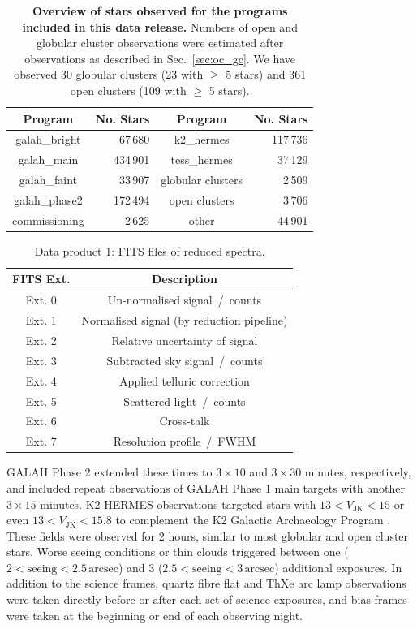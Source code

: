 \documentclass[
  journal=pasa,
  manuscript=research-paper, %
  year=2024,
  volume=37
]{cup-journal}
\begin{document}
\begin{table}
\centering
 \caption{\textbf{Overview of stars observed for the programs included in this data release.} Numbers of open and globular cluster observations were estimated after observations as described in Sec.~\ref{sec:oc_gc}. We have observed 30 globular clusters (23 with $\geq$ 5 stars) and 361 open clusters (109 with $\geq$ 5 stars).}
\label{tab:field_ids}
\begin{tabular}{crcr}
\hline \hline
Program & No. Stars & Program & No. Stars \\
\hline
galah\_bright & 67\,680 & 
k2\_hermes & 117\,736\\
galah\_main & 434\,901 & 
tess\_hermes & 37\,129\\
galah\_faint & 33\,907 & 
globular clusters & 2\,509\\ %
galah\_phase2 & 172\,494 & 
open clusters & 3\,706\\ %
commissioning & 2\,625 & 
other & 44\,901\\
  \hline
 \end{tabular}
\end{table}

\begin{table}
    \centering
    \caption{Data product 1: FITS files of reduced spectra.}
    \label{tab:reduction_fits}
    \begin{tabular}{cc}
    \hline \hline
    FITS Ext. & Description \\
    \hline
    Ext. 0 & Un-normalised signal~/~counts \\
    Ext. 1 & Normalised signal (by reduction pipeline) \\
    Ext. 2 & Relative uncertainty of signal \\
    Ext. 3 & Subtracted sky signal~/~counts \\
    Ext. 4 & Applied telluric correction \\
    Ext. 5 & Scattered light~/~counts \\
    Ext. 6 & Cross-talk \\
    Ext. 7 & Resolution profile~/~FWHM \\
    \hline
    \end{tabular}
\end{table}

GALAH Phase 2 extended these times to $3 \times 10$ and $3 \times 30$ minutes, respectively, and included repeat observations of GALAH Phase 1 main targets with another $3 \times 15$ minutes. K2-HERMES observations targeted stars with $13 < V_\mathrm{JK} < 15$ or even $13 < V_\mathrm{JK} < 15.8$ to complement the K2 Galactic Archaeology Program \citep{Stello2015}. These fields were observed for 2 hours, similar to most globular and open cluster stars. Worse seeing conditions or thin clouds triggered between one ($2 < \mathrm{seeing} < 2.5\,\mathrm{arcsec}$) and 3 ($2.5 < \mathrm{seeing} < 3\,\mathrm{arcsec}$) additional exposures. In addition to the science frames, quartz fibre flat and ThXe arc lamp observations were taken directly before or after each set of science exposures, and bias frames were taken at the beginning or end of each observing night.
\end{document}
